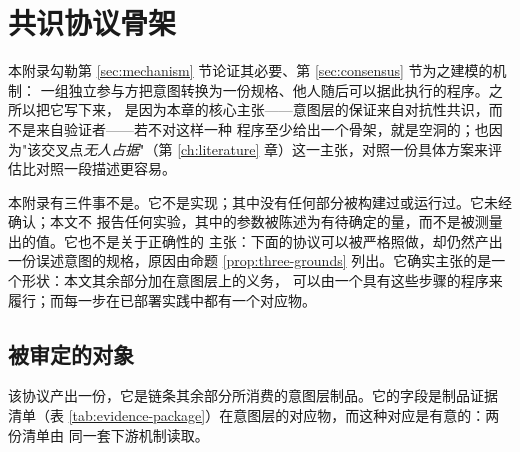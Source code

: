 \chapter{共识协议骨架}\label{app:protocol}

本附录勾勒第 \ref{sec:mechanism} 节论证其必要、第 \ref{sec:consensus} 节为之建模的机制：
一组独立参与方把意图转换为一份规格、他人随后可以据此执行的程序。之所以把它写下来，
是因为本章的核心主张——意图层的保证来自对抗性共识，而不是来自验证者——若不对这样一种
程序至少给出一个骨架，就是空洞的；也因为"该交叉点\emph{无人占据}"（第
\ref{ch:literature} 章）这一主张，对照一份具体方案来评估比对照一段描述更容易。

本附录有三件事不是。它不是实现；其中没有任何部分被构建过或运行过。它未经确认；本文不
报告任何实验，其中的参数被陈述为有待确定的量，而不是被测量出的值。它也不是关于正确性的
主张：下面的协议可以被严格照做，却仍然产出一份误述意图的规格，原因由命题
\ref{prop:three-grounds} 列出。它确实主张的是一个形状：本文其余部分加在意图层上的义务，
可以由一个具有这些步骤的程序来履行；而每一步在已部署实践中都有一个对应物。

\section{被审定的对象}

该协议产出一份，它是链条其余部分所消费的意图层制品。它的字段是制品证据
清单（表 \ref{tab:evidence-package}）在意图层的对应物，而这种对应是有意的：两份清单由
同一套下游机制读取。

